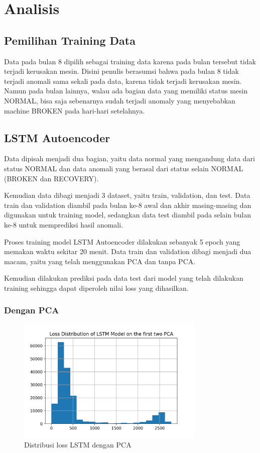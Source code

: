 \chapter{Analisis}

\section{Pemilihan Training Data}
Data pada bulan 8 dipilih sebagai training data karena pada bulan tersebut tidak terjadi kerusakan mesin. Disini penulis berasumsi bahwa pada bulan 8 tidak terjadi anomali sama sekali pada data, karena tidak terjadi kerusakan mesin. Namun pada bulan lainnya, walau ada bagian data yang memiliki status mesin NORMAL, bisa saja sebenarnya sudah terjadi anomaly yang menyebabkan machine BROKEN pada hari-hari setelahnya.

\section{LSTM Autoencoder}

Data dipisah menjadi dua bagian, yaitu data normal yang mengandung data dari status NORMAL dan data anomali yang berasal dari status selain NORMAL (BROKEN dan RECOVERY).

Kemudian data dibagi menjadi 3 dataset, yaitu train, validation, dan test. Data train dan validation diambil pada bulan ke-8 awal dan akhir masing-masing dan digunakan untuk training model, sedangkan data test diambil pada selain bulan ke-8 untuk memprediksi hasil anomali.

Proses training model LSTM Autoencoder dilakukan sebanyak 5 epoch yang memakan waktu sekitar 20 menit. Data train dan validation dibagi menjadi dua macam, yaitu yang telah menggunakan PCA dan tanpa PCA.

Kemudian dilakukan prediksi pada data test dari model yang telah dilakukan training sehingga dapat diperoleh nilai loss yang dihasilkan.

    \subsection{Dengan PCA}

    \begin{figure}[h]
        \centering
        \includegraphics[width=0.8\textwidth]{resources/LSTM/LSTM_PCA_LossDist.png}
        \caption{Distribusi loss LSTM dengan PCA}
    \end{figure}

